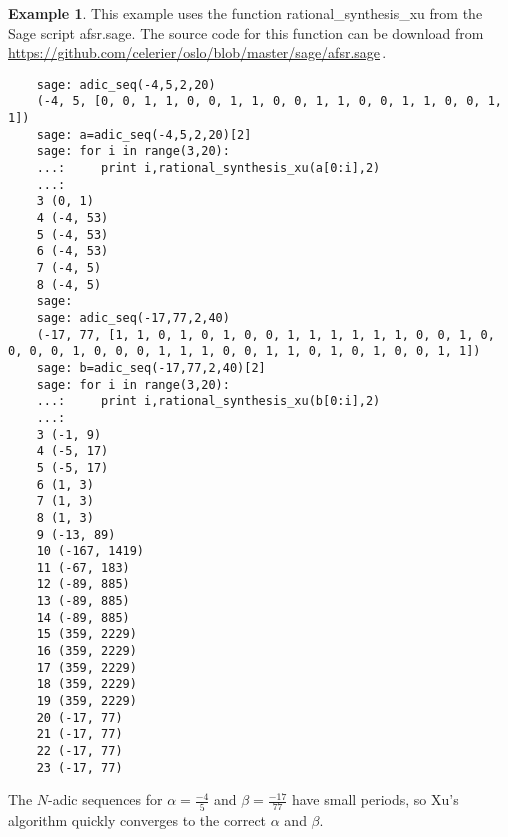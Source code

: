 \documentclass[english]{article}
\theoremstyle{plain}
\theoremstyle{definition}
\newtheorem{example}[theorem]{Example}
\theoremstyle{remark}
\begin{document}
\begin{example}
  This example uses the function {\ttfamily rational\_synthesis\_xu}
  from the {\ttfamily Sage} script {\ttfamily afsr.sage}. The source code for
  this function can be download from
  \url{https://github.com/celerier/oslo/blob/master/sage/afsr.sage}\,.
  \begin{lstlisting}
    sage: adic_seq(-4,5,2,20)
    (-4, 5, [0, 0, 1, 1, 0, 0, 1, 1, 0, 0, 1, 1, 0, 0, 1, 1, 0, 0, 1, 1])
    sage: a=adic_seq(-4,5,2,20)[2]
    sage: for i in range(3,20):
    ...:     print i,rational_synthesis_xu(a[0:i],2)
    ...:     
    3 (0, 1)
    4 (-4, 53)
    5 (-4, 53)
    6 (-4, 53)
    7 (-4, 5)
    8 (-4, 5)
    sage:
    sage: adic_seq(-17,77,2,40)
    (-17, 77, [1, 1, 0, 1, 0, 1, 0, 0, 1, 1, 1, 1, 1, 1, 0, 0, 1, 0, 0, 0, 0, 1, 0, 0, 0, 1, 1, 1, 0, 0, 1, 1, 0, 1, 0, 1, 0, 0, 1, 1])
    sage: b=adic_seq(-17,77,2,40)[2]
    sage: for i in range(3,20):
    ...:     print i,rational_synthesis_xu(b[0:i],2)
    ...:     
    3 (-1, 9)
    4 (-5, 17)
    5 (-5, 17)
    6 (1, 3)
    7 (1, 3)
    8 (1, 3)
    9 (-13, 89)
    10 (-167, 1419)
    11 (-67, 183)
    12 (-89, 885)
    13 (-89, 885)
    14 (-89, 885)
    15 (359, 2229)
    16 (359, 2229)
    17 (359, 2229)
    18 (359, 2229)
    19 (359, 2229)
    20 (-17, 77)
    21 (-17, 77)
    22 (-17, 77)
    23 (-17, 77)
  \end{lstlisting}

  \par The $N$-adic sequences for $\alpha=\frac{-4}{5}$ and $\beta=\frac{-17}{77}$
  have small periods, so Xu's algorithm quickly converges to the correct $\alpha$
  and $\beta$. 
\end{example}
\end{document}
